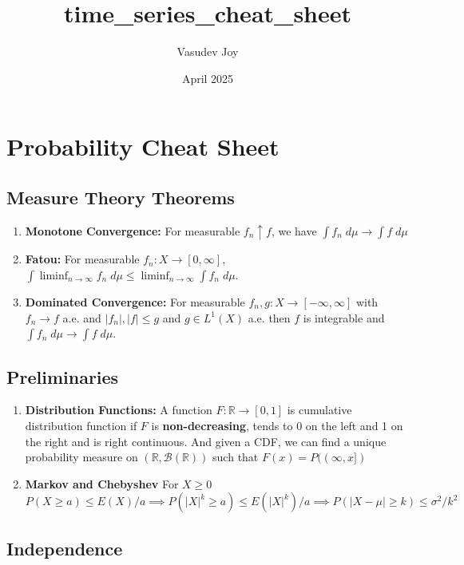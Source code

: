 \documentclass{article}
\title{time_series_cheat_sheet}
\author{Vasudev Joy}
\date{April 2025}
\begin{document}
\section*{Probability Cheat Sheet}

\subsection*{Measure Theory Theorems}

\begin{enumerate}
    \item \textbf{Monotone Convergence:} For measurable \(f_n \uparrow f\), we have \(\int f_n \; d\mu \to \int f \; d\mu\)
    \item \textbf{Fatou:} For measurable \(f_n:X \to [0, \infty]\), \(\int \liminf_{n \to \infty} f_n \; d\mu \leq \liminf_{n \to \infty} \int f_n \; d\mu\).
    \item \textbf{Dominated Convergence:} For measurable \(f_n, g: X \to [-\infty, \infty]\) with \(f_n \to f\) a.e. and \(|f_n|, |f| \leq g\) and \(g \in L^1(X)\) a.e. then \(f\) is integrable and \(\int f_n \; d\mu \to \int f \; d\mu\).
\end{enumerate}

\subsection*{Preliminaries}

\begin{enumerate}
    \item \textbf{Distribution Functions:} A function \(F: \mathbb{R}\to [0,1]\) is cumulative distribution function if \(F\) is \textbf{non-decreasing}, tends to 0 on the left and 1 on the right and is right continuous. And given a CDF, we can find a unique probability measure on \((\mathbb{R}, \mathcal{B}(\mathbb{R}))\) such that \(F(x) = P((\infty, x])\)
    \item \textbf{Markov and Chebyshev} For \(X \geq 0\)
    \[
    P(X \geq a) \leq E(X)/a \implies P(|X|^k\geq a)\leq E(|X|^k)/a \implies P(|X- \mu|\geq k) \leq  \sigma^2/k^2
    \]
\end{enumerate}

\subsection*{Independence}
\end{document}
